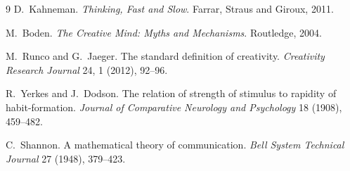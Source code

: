 \documentclass[sigconf,nonacm]{acmart}
\begin{document}
\begin{thebibliography}{9}
D.~Kahneman.
\newblock \textit{Thinking, Fast and Slow}.
\newblock Farrar, Straus and Giroux, 2011.

M.~Boden.
\newblock \textit{The Creative Mind: Myths and Mechanisms}.
\newblock Routledge, 2004.

M.~Runco and G.~Jaeger.
\newblock The standard definition of creativity.
\newblock \textit{Creativity Research Journal} 24, 1 (2012), 92--96.

R.~Yerkes and J.~Dodson.
\newblock The relation of strength of stimulus to rapidity of habit-formation.
\newblock \textit{Journal of Comparative Neurology and Psychology} 18 (1908), 459--482.

C.~Shannon.
\newblock A mathematical theory of communication.
\newblock \textit{Bell System Technical Journal} 27 (1948), 379--423.
\end{thebibliography}
\end{document}
